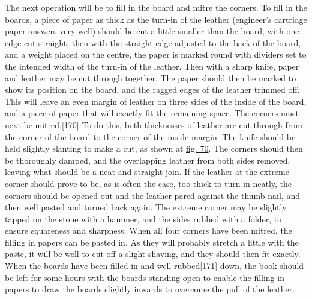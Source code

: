 \documentclass[
]{article}
\begin{document}
The next operation will be to fill in the board and mitre the corners.
To fill in the boards, a piece of paper as thick as the turn-in of the
leather (engineer's cartridge paper answers very well) should be cut a
little smaller than the board, with one edge cut straight; then with the
straight edge adjusted to the back of the board, and a weight placed on
the centre, the paper is marked round with dividers set to the intended
width of the turn-in of the leather. Then with a sharp knife, paper and
leather may be cut through together. The paper should then be marked to
show its position on the board, and the ragged edges of the leather
trimmed off. This will leave an even margin of leather on three sides of
the inside of the board, and a piece of paper that will exactly fit the
remaining space. The corners must next be
mitred.{\protect\hypertarget{Page_170}{}{{[}170{]}}} To do this, both
thicknesses of leather are cut through from the corner of the board to
the corner of the inside margin. The knife should be held slightly
slanting to make a cut, as shown at \protect\hyperlink{Fig_70}{fig. 70}.
The corners should then be thoroughly damped, and the overlapping
leather from both sides removed, leaving what should be a neat and
straight join. If the leather at the extreme corner should prove to be,
as is often the case, too thick to turn in neatly, the corners should be
opened out and the leather pared against the thumb nail, and then well
pasted and turned back again. The extreme corner may be slightly tapped
on the stone with a hammer, and the sides rubbed with a folder, to
ensure squareness and sharpness. When all four corners have been mitred,
the filling in papers can be pasted in. As they will probably stretch a
little with the paste, it will be well to cut off a slight shaving, and
they should then fit exactly. When the boards have been filled in and
well rubbed{\protect\hypertarget{Page_171}{}{{[}171{]}}} down, the book
should be left for some hours with the boards standing open to enable
the filling-in papers to draw the boards slightly inwards to overcome
the pull of the leather.
\end{document}
